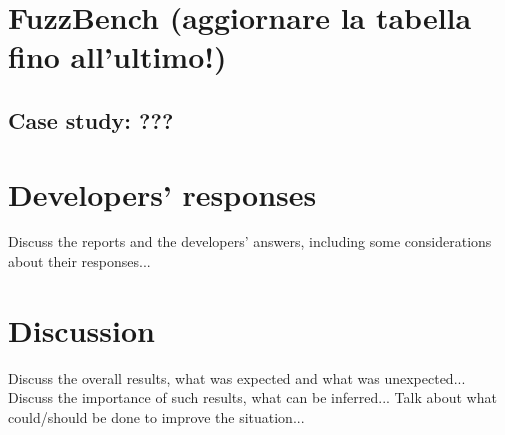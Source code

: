 



 \section{FuzzBench (aggiornare la tabella fino all'ultimo!)}



\subsection{Case study: ???}

\section{Developers' responses}
Discuss the reports and the developers' answers, including some considerations about their responses...

\section{Discussion}
Discuss the overall results, what was expected and what was unexpected...
Discuss the importance of such results, what can be inferred...
Talk about what could/should be done to improve the situation...
